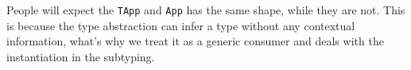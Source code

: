 \documentclass{article}
\begin{document}
People will expect the \texttt{TApp} and \texttt{App} has the same shape, while they are not. This is because the type abstraction can infer a type without any contextual information, what's why we treat it as a generic consumer and deals with the instantiation in the subtyping.

\begin{comment}
\subsection{Subtyping: $\boxed{\Gamma \vdash A <: \Sigma \dashv \Gamma' \rightsquigarrow A}$}

\begin{mathpar}
\inferrule*[lab=S-Int]
{ }
{\Gamma \vdash \mathtt{Int} <: \mathtt{Int} \dashv \Gamma \rightsquigarrow \mathtt{Int}}

\inferrule*[lab=S-Empty]
{FV_{ex}(\Gamma, A) = . \\ \Gamma \vdash A}
{\Gamma \vdash A <: \square \dashv \Gamma \rightsquigarrow A}

\inferrule*[lab=S-Ex-L]
{FV_{ex}(\Gamma, A) = . \\ \Gamma \vdash A}
{\Gamma \vdash \hat{a} <: A \dashv [A/\hat{a}]~\Gamma \rightsquigarrow A}

\inferrule*[lab=S-Ex-R]
{FV_{ex}(\Gamma, A) = . \\ \Gamma \vdash A}
{\Gamma \vdash A <: \hat{a} \dashv [A/\hat{a}]~\Gamma \rightsquigarrow A}

\inferrule*[lab=S-Arr]
{\Gamma \vdash C <: A \dashv \Gamma_1 \rightsquigarrow A' \\
 \Gamma_1 \vdash B <: D \dashv \Gamma_2 \rightsquigarrow D'}
{\Gamma \vdash A \rightarrow B <: C \rightarrow D \dashv \Gamma_2 \rightsquigarrow C \rightarrow D}

\inferrule*[lab=S-Hole-No-Ex]
{ FV_{ex}(\Gamma, A) = . \\
\Gamma \vdash A \Rightarrow e \Rightarrow C\\
 \Gamma \vdash B <: \Sigma \dashv \Gamma' \rightsquigarrow D}
{\Gamma \vdash A \rightarrow B <: \boxed{e} \leadsto \Sigma \dashv \Gamma' \rightsquigarrow A \rightarrow D}

\inferrule*[lab=S-Hole-Ex]
{ FV_{ex}(A) \neq . \\
\Gamma \vdash \square \Rightarrow e \Rightarrow C\\
\Gamma \vdash C <: A \dashv \Gamma_1 \rightsquigarrow A' \\
\Gamma_1 \vdash B <: \Sigma \dashv \Gamma_2 \rightsquigarrow D}
{\Gamma \vdash A \rightarrow B <: \boxed{e} \leadsto \Sigma \dashv \Gamma_2 \rightsquigarrow A' \rightarrow D}

\inferrule*[lab=S-All]
{\Gamma, a \vdash A <: B \dashv \Gamma', a\rightsquigarrow C}
{\Gamma \vdash \forall a. A <: \forall a. B \dashv \Gamma' \rightsquigarrow \forall a. C}

\inferrule*[lab=S-All-L]
{\Gamma, \hat{a} \vdash [\hat{a}/a]A <: \boxed{e} \leadsto \Sigma \dashv \Gamma', \hat{a} \rightsquigarrow B}
{\Gamma \vdash \forall a. A <: \boxed{e} \leadsto \Sigma \dashv \Gamma' \rightsquigarrow B}
\end{mathpar}
\end{comment}
\end{document}
